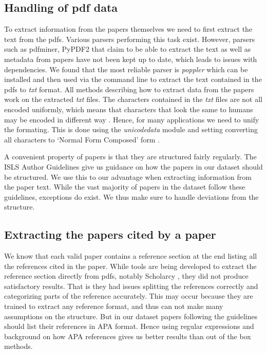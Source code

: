 \documentclass[article,twocolumn]{IEEEtran}
\begin{document}
    \hypertarget{handling-of-pdf-data}{%
\subsection{Handling of pdf data}\label{handling-of-pdf-data}}

To extract information from the papers themselves we need to first
extract the text from the pdfs. Various parsers performing this task
exist. However, parsers such as pdfminer, PyPDF2 that claim to be able
to extract the text as well as metadata from papers have not been kept
up to date, which leads to issues with dependencies. We found that the
most reliable parser is \emph{poppler} \cite{poppler} which can be
installed and then used via the command line to extract the text
contained in the pdfs to \emph{txt} format. All methods describing how
to extract data from the papers work on the extracted \emph{txt} files.
The characters contained in the \emph{txt} files are not all encoded
uniformly, which means that characters that look the same to humans may
be encoded in different way . Hence, for many applications we need to
unify the formating. This is done using the \emph{unicodedata} module
and setting converting all characters to `Normal Form Composed' form .

A convenient property of papers is that they are structured fairly
regularly. The ISLS Author Guidelines \cite{guidelines} give us guidance
on how the papers in our dataset should be structured. We use this to
our advantage when extracting information from the paper text. While the
vast majority of papers in the dataset follow these guidelines,
exceptions do exist. We thus make sure to handle deviations from the
structure.

\hypertarget{extracting-the-papers-cited-by-a-paper}{%
\subsection{Extracting the papers cited by a
paper}\label{extracting-the-papers-cited-by-a-paper}}

We know that each valid paper contains a reference section at the end
listing all the references cited in the paper. While tools are being
developed to extract the reference section directly from pdfs, notably
Scholarcy \cite{scholarcy}, they did not produce satisfactory results.
That is they had issues splitting the references correctly and
categorizing parts of the reference accurately. This may occur because
they are trained to extract any reference format, and thus can not make
many assumptions on the structure. But in our dataset papers following
the guidelines should list their references in APA format. Hence using
regular expressions and background on how APA references gives us better
results than out of the box methods.
\end{document}
